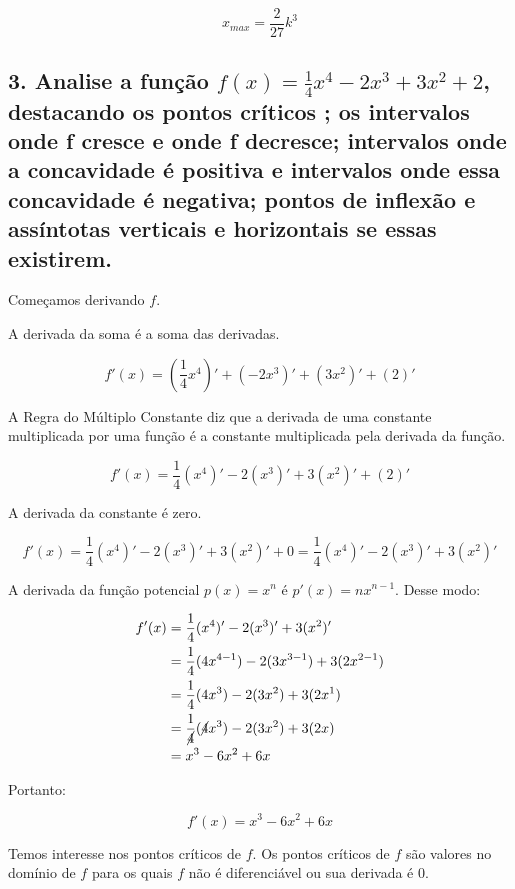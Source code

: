 \documentclass{article}
\begin{document}
\[
    x_{max} = \frac{2}{27} k^3
\]

\subsection*{3. Analise a função \(f(x) = \frac{1}{4}x^4-2x^3+3x^2+2\), destacando os
    pontos críticos ; os intervalos onde f cresce e onde f decresce; intervalos
    onde a concavidade é positiva e intervalos onde essa concavidade é
    negativa; pontos de inflexão e assíntotas verticais e horizontais se
    essas existirem.}


Começamos derivando \(f\).

A derivada da soma é a soma das derivadas.

\[
    f'(x) = \left(\frac{1}{4}x^4\right)'+(-2x^3)'+(3x^2)'+(2)'
\]

A Regra do Múltiplo Constante diz que a derivada de uma constante multiplicada
por uma função é a constante multiplicada pela derivada da função.

\[
    f'(x) = \frac{1}{4}(x^4)'-2(x^3)'+ 3(x^2)' + (2)'
\]

A derivada da constante é zero.

\[
    f'(x) = \frac{1}{4}(x^4)'-2(x^3)'+ 3(x^2)' + 0 = \frac{1}{4}(x^4)'-2(x^3)'+ 3(x^2)'
\]

A derivada da função potencial \(p(x) = x^n\) é  \(p'(x) = nx^{n-1}\). Desse modo:

\begin{align*}
    f'(x)
     & = \frac{1}{4}(x^4)'-2(x^3)'+ 3(x^2)'                   \\
     & = \frac{1}{4}(4x^{4-1})-2(3x^{3-1})+ 3(2x^{2-1})       \\
     & = \frac{1}{4}(4x^{3})-2(3x^2)+ 3(2x^1)                 \\
     & = \frac{1}{\cancel{4}}(\cancel{4}x^{3})-2(3x^2)+ 3(2x) \\
     & = x^{3}-6x^2+ 6x                                       \\
\end{align*}

Portanto:

\begin{equation}\label{eq:q3_derivative_f}
    f'(x) = x^{3}-6x^2+ 6x
\end{equation}

Temos interesse nos pontos críticos de \(f\). Os pontos críticos de \(f\) são
valores no domínio de \(f\) para os quais \(f\) não é diferenciável ou sua
derivada é \(0\).
\end{document}

